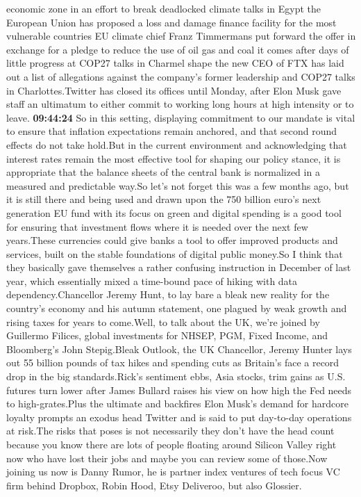 \documentclass{article}%
\begin{document}
economic zone in an effort to break deadlocked climate talks in Egypt the European Union has proposed a loss and damage finance facility for the most vulnerable countries EU climate chief Franz Timmermans put forward the offer in exchange for a pledge to reduce the use of oil gas and coal it comes after days of little progress at COP27 talks in Charmel shape the new CEO of FTX has laid out a list of allegations against the company's former leadership  and COP27 talks in Charlottes.Twitter has closed its offices until Monday, after Elon Musk gave staff an ultimatum to either commit to working long hours at high intensity or to leave.%
\textbf{09:44:24}%
\newline%
So in this setting, displaying commitment to our mandate is vital to ensure that inflation expectations remain anchored, and that second round effects do not take hold.But in the current environment and acknowledging that interest rates remain the most effective tool for shaping our policy stance, it is appropriate that the balance sheets of the central bank is normalized in a measured and predictable way.So let's not forget this was a few months ago, but it is still there and being used and drawn upon the 750 billion euro's next generation EU fund with its focus on green and digital spending is a good tool for ensuring that investment flows where it is needed over the next few years.These currencies could give banks a tool to offer improved products and services, built on the stable foundations of digital public money.So I think that they basically gave themselves a rather confusing instruction in December of last year, which essentially mixed a time{-}bound pace of hiking with data dependency.Chancellor Jeremy Hunt, to lay bare a bleak new reality for the country's economy and his autumn statement, one plagued by weak growth and rising taxes for years to come.Well, to talk about the UK, we're joined by Guillermo Filices, global investments for NHSEP, PGM, Fixed Income, and Bloomberg's John Stepig.Bleak Outlook, the UK Chancellor, Jeremy Hunter lays out 55 billion pounds of tax hikes and spending cuts as Britain's face a record drop in the big standards.Rick's sentiment ebbs, Asia stocks, trim gains as U.S. futures turn lower after James Bullard raises his view on how high the Fed needs to high{-}grates.Plus the ultimate and backfires Elon Musk's demand for hardcore loyalty prompts an exodus head Twitter and is said to put day{-}to{-}day operations at risk.The risks that poses is not necessarily they don't have the head count because you know there are lots of people floating around Silicon Valley right now who have lost their jobs and maybe you can review some of those.Now joining us now is Danny Rumor, he is partner index ventures of tech focus VC firm behind Dropbox, Robin Hood, Etsy Deliveroo, but also Glossier.%
\end{document}
